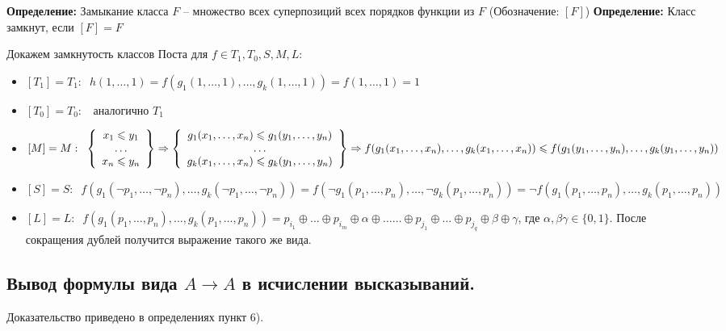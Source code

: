 \textbf{Определение:} Замыкание класса $F$ -- множество всех суперпозиций всех порядков функции из $F$ (Обозначение: $[F]$)
\textbf{Определение:} Класс замкнут, если $[F]=F$
\newline \par Докажем замкнутость классов Поста для $f \in T_1,T_0,S,M,L$:
\begin{itemize}
    \item $[T_1] = T_1: \;\; h(1,\ldots,1)=f(g_1(1,\ldots,1),\ldots,g_k(1,\ldots,1))=f(1,\ldots,1)=1$
    \item $[T_0] = T_0: \;\;$ аналогично $T_1$
    \item $[M] = M: \;\; 
            \left\{
              \begin{array}{ccc}
                    x_1\leqslant y_1\\
                    \ldots \\
                    x_n\leqslant y_n
              \end{array}
            \right\} \Rightarrow 
            \left\{
              \begin{array}{ccc}
                    g_1(x_1,\ldots,x_n)\leqslant g_1(y_1,\ldots,y_n)\\
                    \ldots \\
                    g_k(x_1,\ldots,x_n)\leqslant g_k(y_1,\ldots,y_n)
              \end{array}
            \right\} \Rightarrow \newline
            f(g_1(x_1,\ldots,x_n),\ldots,g_k(x_1,\ldots,x_n)) \leqslant f(g_1(y_1,\ldots,y_n),\ldots,g_k(y_1,\ldots,y_n)) $
    \item $[S] = S: \;\; f(g_1(\neg p_1,\ldots,\neg p_n),\ldots,g_k(\neg p_1,\ldots,\neg p_n)) = f(\neg g_1(p_1,\ldots,p_n),\ldots,\neg g_k(p_1,\ldots,p_n)) = \neg f(g_1(p_1,\ldots,p_n),\ldots,g_k(p_1,\ldots,p_n))$
    \item $[L] = L: \;\; f(g_1(p_1,\ldots,p_n),\ldots,g_k(p_1,\ldots,p_n)) = p_{i_1}\oplus \ldots \oplus p_{i_m} \oplus\alpha\oplus\ldots\ldots\oplus p_{j_1}\oplus \ldots \oplus p_{j_q} \oplus\beta\oplus\gamma$, где $\alpha,\beta\gamma\in\{0,1\}$. После сокращения дублей получится выражение такого же вида.
\end{itemize}

\subsection{Вывод формулы вида $A \to A$ в исчислении высказываний.}
Доказательство приведено в определениях пункт 6). 

